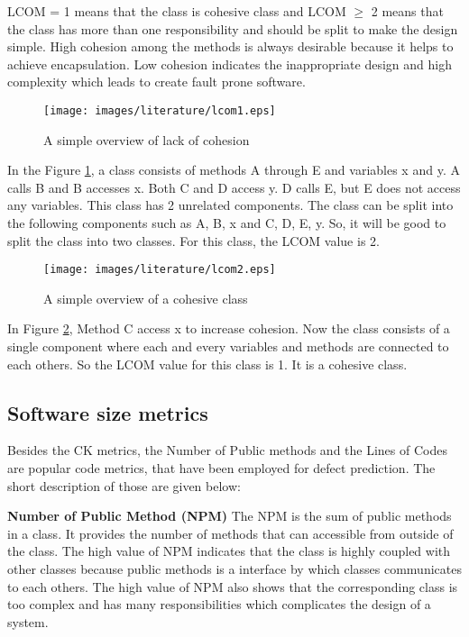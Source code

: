 \documentclass[12pt]{report}
\begin{document}
LCOM = 1 means that the class is cohesive class and LCOM $\geq$ 2 means that the class has more than one responsibility and should be split to make the design simple. High cohesion among the methods is always desirable because it helps to achieve encapsulation. Low cohesion indicates the inappropriate design and high complexity which leads to create fault prone software.   

\begin{figure}[h!]
  \centering
    \texttt{[image: images/literature/lcom1.eps]}
		\caption{A simple overview of lack of cohesion}
		\label{lcom1}
\end{figure}


In the Figure \ref{lcom1}, a class consists of methods A through E and variables x and y. A calls B and B accesses x. Both C and D access y. D calls E, but E does not access any variables. This class has 2 unrelated components. The class can be split into the following components such as {A, B, x} and {C, D, E, y}. So, it will be good to split the class into two classes. For this class, the LCOM value is 2. 
\begin{figure}[h!]
  \centering
    \texttt{[image: images/literature/lcom2.eps]}
		\caption{A simple overview of a cohesive class}
		\label{lcom2}
\end{figure}

In Figure \ref{lcom2}, Method C access x to increase cohesion. Now the class consists of a single component where each and every variables and methods are connected to each others. So the LCOM value for this class is 1. It is a cohesive class. 

\subsection{ Software size metrics}
Besides the CK metrics, the Number of Public methods and the Lines of Codes are popular code metrics, that have been employed for defect prediction. The short description of those are given below:

\textbf{Number of Public Method (NPM)}
The NPM is the sum of public methods in a class. It provides the number of methods that can accessible from outside of the class. The high value of NPM indicates that the class is highly coupled with other classes because public methods is a interface by which classes communicates to each others. The high value of NPM also shows that the corresponding class is too complex and has many responsibilities which complicates the design of a system.
\end{document}
